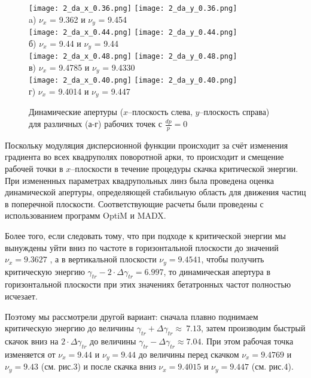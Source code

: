 \begin{figure} \label{fig:da_nica_jump}
   \centering 
   \texttt{[image: 2\_da\_x\_0.36.png]}
   \texttt{[image: 2\_da\_y\_0.36.png]}\\
a) $\nu_x$ = 9.362 и $\nu_y$ = 9.454\\
   \texttt{[image: 2\_da\_x\_0.44.png]}
   \texttt{[image: 2\_da\_y\_0.44.png]}\\
б) $\nu_x$ = 9.44 и $\nu_y$ = 9.44\\
   \texttt{[image: 2\_da\_x\_0.48.png]}
   \texttt{[image: 2\_da\_y\_0.48.png]}\\
в) $\nu_x$ = 9.4785 и $\nu_y$ = 9.4330\\
   \texttt{[image: 2\_da\_x\_0.40.png]}
   \texttt{[image: 2\_da\_y\_0.40.png]}\\
 г) $\nu_x$ = 9.4014 и $\nu_y$ = 9.447\\
    \caption{Динамические апертуры ($x$–плоскость слева, $y$–плоскость справа) для различных (а-г) рабочих точек с $\frac{dp}{p} = 0$}
\end{figure}

\par Поскольку модуляция дисперсионной функции происходит за счёт изменения градиента во всех квадруполях поворотной арки, то происходит и смещение рабочей точки в $x$--плоскости в течение процедуры скачка критической энергии. При измененных параметрах квадрупольных линз была проведена оценка динамической апертуры, определяющей стабильную область для движения частиц в поперечной плоскости. Соответствующие расчеты были проведены с использованием программ OptiM и MADX. 

\par Более того, если следовать тому, что при подходе к критической энергии мы вынуждены уйти вниз по частоте в горизонтальной плоскости до значений $\nu_x=9.3627$ , а в вертикальной плоскости $\nu_y=9.4541$, чтобы получить критическую энергию  $\gamma_{tr}-{2\cdot\Delta\gamma}_{tr}=6.997$, то динамическая апертура в горизонтальной плоскости при этих значениях бетатронных частот полностью исчезает.
 
\par Поэтому мы рассмотрели другой вариант: сначала плавно поднимаем критическую энергию до величины $\gamma_{tr}+{\Delta\gamma}_{tr}\approx\ 7.13$, затем производим быстрый скачок вниз на $2\cdot{\Delta\gamma}_{tr}$ до величины $\gamma_{tr}-{\Delta\gamma}_{tr}\approx7.04$. При этом рабочая точка изменяется от $\nu_x=9.44$ и $\nu_y=9.44$  до величины перед скачком $\nu_x=9.4769$ и $\nu_y=9.43$ (см. рис.3) и после скачка вниз $\nu_x=9.4015$ и $\nu_y=9.447$ (см. рис.4).

